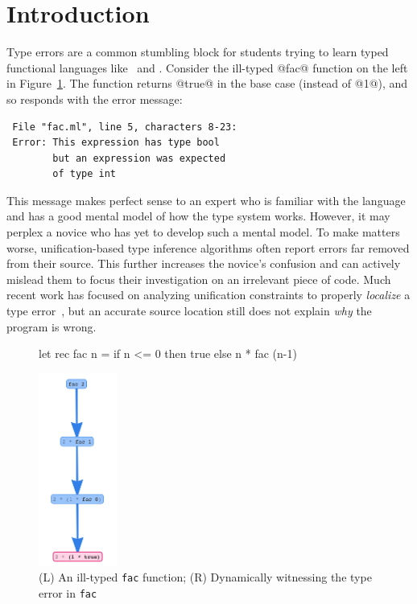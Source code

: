 \section{Introduction}
\label{sec:introduction}

Type errors are a common stumbling block for students
trying to learn typed functional languages like \ocaml\
and \haskell.
%
Consider the ill-typed @fac@ function on the left in
Figure~\ref{fig:factorial}.
%
The function returns @true@ in the base case (instead of @1@),
and so \ocaml responds with the error message:
%
\begin{verbatim}
 File "fac.ml", line 5, characters 8-23:
 Error: This expression has type bool
        but an expression was expected
        of type int
\end{verbatim}
%
This message makes perfect sense to an expert who is familiar
with the language and has a good mental model of how the type
system works.
%
However, it may perplex a novice who has yet to develop such a
mental model.
%
To make matters worse, unification-based type inference algorithms
often report errors far removed from their source.
%
This further increases the novice's confusion and can actively mislead
them to focus their investigation on an irrelevant piece of code.
%
Much recent work has focused on analyzing unification constraints
to properly \emph{localize} a type error~\cite{lerner_searching_2007,chen_counter-factual_2014,zhang_toward_2014,pavlinovic_finding_2014},
but an accurate source location still does not explain \emph{why} the
program is wrong.


\begin{figure}[t]
\centering
\begin{minipage}{.49\linewidth}
\begin{code}
let rec fac n =
  if n <= 0 then
    true
  else
    n * fac (n-1)
\end{code}
\end{minipage}
\hspace{0.3in}
\begin{minipage}{.3\linewidth}
  \includegraphics[height=2.5in]{fac-overview.png}
\end{minipage}
\caption{(L) An ill-typed \texttt{fac} function; (R) Dynamically witnessing the type error in \texttt{fac}}
\label{fig:factorial}
\end{figure}

